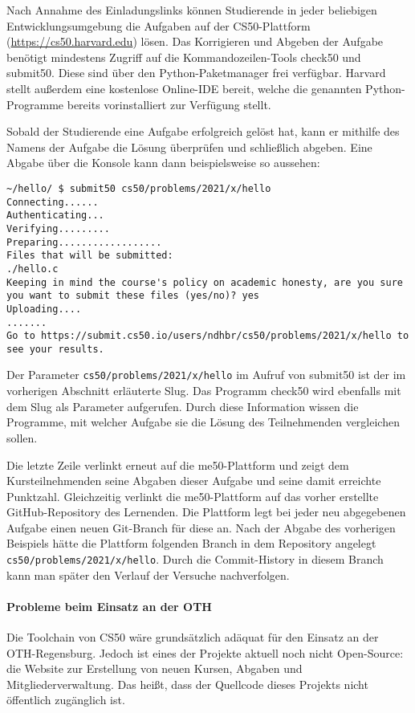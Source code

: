 Nach Annahme des Einladungslinks können Studierende in jeder beliebigen
Entwicklungsumgebung die Aufgaben auf der CS50-Plattform
(\url{https://cs50.harvard.edu}) lösen. Das Korrigieren und Abgeben der Aufgabe
benötigt mindestens Zugriff auf die Kommandozeilen-Tools check50 und submit50.
Diese sind über den Python-Paketmanager frei verfügbar. Harvard stellt außerdem
eine kostenlose Online-IDE bereit, welche die genannten Python-Programme bereits
vorinstalliert zur Verfügung stellt.

Sobald der Studierende eine Aufgabe erfolgreich gelöst hat, kann er mithilfe des
Namens der Aufgabe die Lösung überprüfen und schließlich abgeben. Eine Abgabe
über die Konsole kann dann beispielsweise so aussehen:

\begin{lstlisting}[style=Bash]
~/hello/ $ submit50 cs50/problems/2021/x/hello
Connecting......
Authenticating...
Verifying.........
Preparing..................
Files that will be submitted:
./hello.c
Keeping in mind the course's policy on academic honesty, are you sure you want to submit these files (yes/no)? yes
Uploading....
.......
Go to https://submit.cs50.io/users/ndhbr/cs50/problems/2021/x/hello to see your results.
\end{lstlisting}

Der Parameter \texttt{cs50/problems/2021/x/hello} im Aufruf von submit50 ist
der im vorherigen Abschnitt erläuterte Slug. Das Programm check50 wird ebenfalls
mit dem Slug als Parameter aufgerufen. Durch diese Information wissen die
Programme, mit welcher Aufgabe sie die Lösung des Teilnehmenden vergleichen
sollen.

Die letzte Zeile verlinkt erneut auf die me50-Plattform und zeigt dem
Kursteilnehmenden seine Abgaben dieser Aufgabe und seine damit erreichte
Punktzahl. Gleichzeitig verlinkt die me50-Plattform auf das vorher erstellte
GitHub-Repository des Lernenden. Die Plattform legt bei jeder neu abgegebenen
Aufgabe einen neuen Git-Branch für diese an. Nach der Abgabe des vorherigen
Beispiels hätte die Plattform folgenden Branch in dem Repository angelegt
\texttt{cs50/problems/2021/x/hello}. Durch die Commit-History in diesem Branch 
kann man später den Verlauf der Versuche nachverfolgen.

\paragraph{Probleme beim Einsatz an der OTH}
Die Toolchain von CS50 wäre grundsätzlich adäquat für den Einsatz an der
OTH-Regensburg. Jedoch ist eines der Projekte aktuell noch nicht Open-Source:
die Website zur Erstellung von neuen Kursen, Abgaben und Mitgliederverwaltung. 
Das heißt, dass der Quellcode dieses Projekts nicht öffentlich zugänglich ist.

